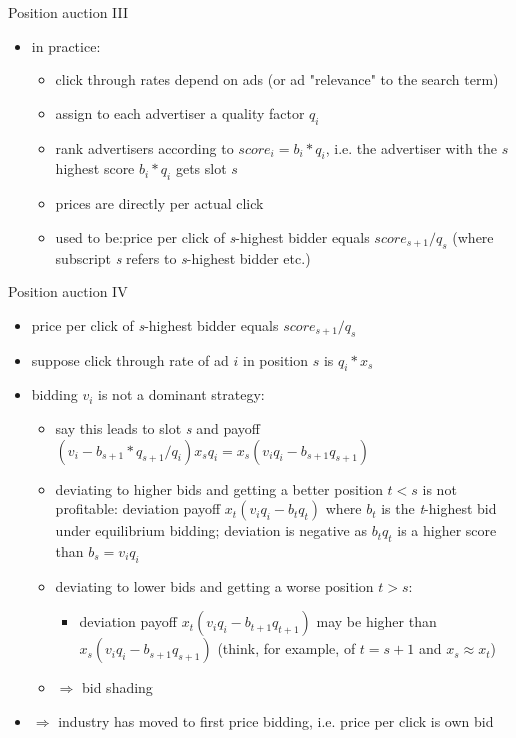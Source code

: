 \documentclass[bigger]{beamer}
\newcommand{\Ra}{\Rightarrow} \newcommand{\ra}{\rightarrow} \newcommand{\Lra}{\Leftrightarrow}
\begin{document}
\begin{frame}[label={sec:orgcae954f}]{Position auction III}
\begin{itemize}
\item in practice:
\begin{itemize}
\item click through rates depend on ads (or ad "relevance" to the search term)
\item assign to each advertiser a quality factor \(q_i\)
\item rank advertisers according to \(score_i=b_i*q_i\), i.e. the advertiser with the \(s\) highest score \(b_i*q_i\) gets slot \(s\)
\item prices are directly per actual click
\item used to be:\linebreak price per click of \emph{s}-highest bidder equals \(score_{s+1}/q_s\) (where subscript \emph{s} refers to \emph{s}-highest bidder etc.)
\end{itemize}
\end{itemize}
\end{frame}
\begin{frame}[label={sec:org946a71c}]{Position auction IV}
\begin{itemize}
\item price per click of \emph{s}-highest bidder equals \(score_{s+1}/q_s\)
\item suppose click through rate of ad \(i\) in position \(s\) is \(q_i*x_s\)
\item bidding \(v_i\) is not a dominant strategy:
\begin{itemize}
\item say this leads to slot \emph{s} and payoff \((v_i-b_{s+1}*q_{s+1}/q_i)x_s q_i=x_s(v_iq_i-b_{s+1}q_{s+1})\)
\item deviating to higher bids and getting a better position \(t<s\) is not profitable: deviation payoff \(x_t(v_iq_i-b_tq_t)\) where \(b_t\) is the \emph{t}-highest bid under equilibrium bidding; deviation is negative as \(b_tq_t\) is a higher score than \(b_s=v_i q_i\)
\item deviating to lower bids and getting a worse position \(t>s\):
\begin{itemize}
\item deviation payoff \(x_t(v_iq_i-b_{t+1}q_{t+1})\) may be higher than \(x_s(v_iq_i-b_{s+1}q_{s+1})\) (think, for example, of \(t=s+1\) and \(x_{s}\approx x_{t}\))
\end{itemize}
\item \(\Ra\) bid shading
\end{itemize}
\item \(\Ra\) industry has moved to first price bidding, i.e. price per click is own bid
\end{itemize}
\end{frame}
\end{document}
